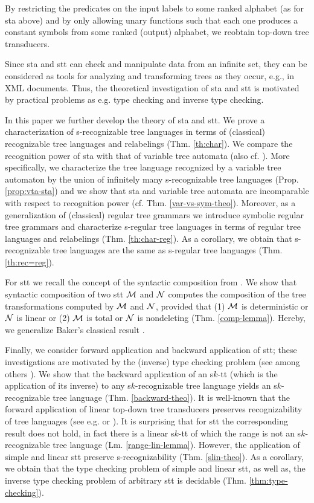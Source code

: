 \documentclass[10pt]{scrartcl}
\begin{document}
 By restricting the predicates on the input labels to some ranked alphabet (as for sta above) and by only allowing unary functions such that each one produces a constant symbols from some ranked (output) alphabet, we reobtain top-down tree transducers.  

Since sta and stt can check and manipulate data from an infinite set, they can be considered as tools for analyzing and transforming trees as they occur, e.g., in XML documents. Thus, the theoretical investigation of sta and stt is motivated by practical problems as e.g. type checking and inverse type checking. 


In this paper we further develop the theory of sta and stt. We prove  a characterization of s-recognizable tree languages in terms of (classical) recognizable tree languages and relabelings (Thm. \ref{th:char}). We compare the recognition power of sta with that of variable tree automata  \cite{menrah11} (also cf.  \cite{grukupshe10}). More specifically, we characterize the tree language recognized by a variable tree automaton by the union of infinitely many s-recognizable tree languages  (Prop. \ref{prop:vta-sta}) and we show that sta and variable tree automata are incomparable  with respect to recognition power (cf. Thm. \ref{var-vs-sym-theo}).
Moreover, as a generalization of (classical) regular tree grammars \cite{bra69} we introduce symbolic regular tree grammars and characterize s-regular tree languages in terms of
regular tree languages and relabelings (Thm. \ref{th:char-reg}). As a corollary, we obtain that s-recognizable tree languages are the same as s-regular tree languages (Thm. \ref{th:rec=reg}).

 For stt we recall the concept of the syntactic composition from \cite{veabjo11b}. We show that  syntactic composition of two stt $\cal M$ and $\cal N$ computes the composition of the tree transformations computed by $\cal M$ and $\cal N$, provided that (1) $\cal M$ is deterministic or $\cal N$ is linear or (2) $\cal M$ is total or $\cal N$ is nondeleting (Thm. \ref{comp-lemma}). Hereby, we generalize Baker's classical result  \cite[Thm. 1]{bak79}. 

Finally, we consider forward application and backward application of stt; these investigations are motivated by the (inverse) type checking problem (see among others \cite{milsucvia03,alomilnevsucvia03,engman03,manberpersei05}). 
We show that the backward application of an s$k$-tt (which is the application of its inverse) to any s$k$-recognizable tree language yields an s$k$-recognizable tree language (Thm. \ref{backward-theo}). It is well-known that the forward application of linear top-down tree transducers preserves recognizability of tree languages (see e.g. \cite{tha69} or \cite[Ch. IV, Cor. 6.6]{gecste84}). It is surprising that for stt the corresponding result does not hold, in fact there is a linear s$k$-tt of which the range is not an s$k$-recognizable tree language (Lm. \ref{range-lin-lemma}). However, the application of simple and linear stt preserve s-recognizability (Thm. \ref{slin-theo}).
As a corollary, we obtain that the type checking problem of simple and linear stt, as well as, the inverse type checking problem of arbitrary stt is decidable (Thm. \ref{thm:type-checking}).
\end{document}
